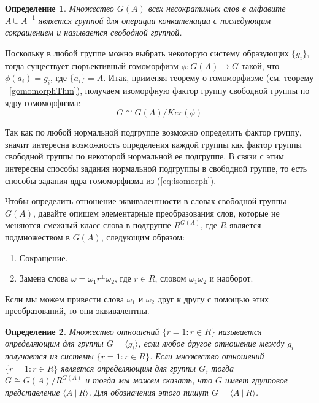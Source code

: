 \documentclass[14pt]{matmex-diploma-custom}
\newtheorem{defn}{Определение}[subsection]
\begin{document}
\begin{defn}
Множество $ G (A) $ всех несократимых слов в алфавите $ A \cup A^{-1} $
является группой для операции конкатенации с последующим сокращением и называется свободной группой.
\end{defn}

Поскольку в любой группе можно выбрать некоторую систему образующих $ \{g_i \} $, тогда существует
сюръективный гомоморфизм $ \phi: G (A) \to G $ такой, что $ \phi (a_i) = g_i $,
где $ \{a_i \} = A $. Итак, применяя теорему о гомоморфизме (см. теорему ~\ref{gomomorphThm}), получаем изоморфную фактор группу свободной группы по ядру гомоморфизма:
\begin{equation} \label{eq:isomorph}
  G \cong G (A) / Ker (\phi)  
\end{equation}

Так как по любой нормальной подгруппе возможно определить фактор группу, значит интересна возможность определения каждой группы
как фактор группы свободной группы по некоторой нормальной ее подгруппе.
В связи с этим интересны способы задания нормальной подгруппы в свободной группе, то есть способы задания ядра гомоморфизма из (\ref{eq:isomorph}).

Чтобы определить отношение эквивалентности в словах свободной группы $G(A)$, давайте опишем элементарные преобразования слов, которые не меняются
смежный класс слова в подгруппе $ R^{G (A)} $, где $ R $ является подмножеством в $ G (A) $, следующим образом:
\begin{enumerate}
\item Сокращение.
\item Замена слова $\omega = \omega_1 r^{\pm} \omega_2$, где $r \in R$, словом $\omega_1 \omega_2$ и наоборот.
\end{enumerate}

Если мы можем привести слова $ \omega_1 $ и $ \omega_2 $ друг к
другу с помощью этих преобразований, то они эквивалентны.

\begin{defn}
Множество отношений $ \{r = 1: r \in R \} $ называется определяющим для группы
$ G = \langle g_i \rangle $, если любое другое отношение между
$ g_i $ получается из системы $ \{r = 1: r \in R \} $. Если множество отношений
$ \{r = 1: r \in R \} $ является определяющим для группы $ G $, тогда $ G \cong G (A)/R^{G (A)} $
и тогда мы можем сказать, что $ G $ имеет групповое представление $ \langle A ~|~ R \rangle $.
Для обозначения этого пишут $G = \langle A ~|~ R \rangle $.
\end{defn}
\end{document}
